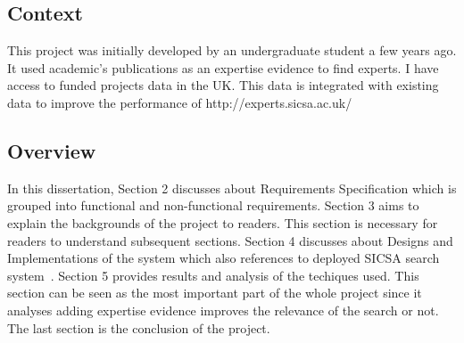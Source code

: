 \subsection{Context}
This project was initially developed by an undergraduate student a few years ago. It used academic's publications as an expertise evidence to find experts.
I have access to funded projects data in the UK. This data is integrated with existing data to improve the performance of http://experts.sicsa.ac.uk/ ~\cite{sicsasearch}

\subsection{Overview}
In this dissertation, Section 2 discusses about Requirements Specification which is grouped into functional and non-functional requirements. Section 3 aims
to explain the backgrounds of the project to readers. This section is necessary for readers to understand subsequent sections. Section 4 discusses
about Designs and Implementations of the system which also references to deployed SICSA search system~\cite{sicsasearch}. Section 5 provides results and
analysis of the techiques used. This section can be seen as the most important part of the whole project since it analyses adding expertise evidence 
improves the relevance of the search or not. The last section is the conclusion of the project.
